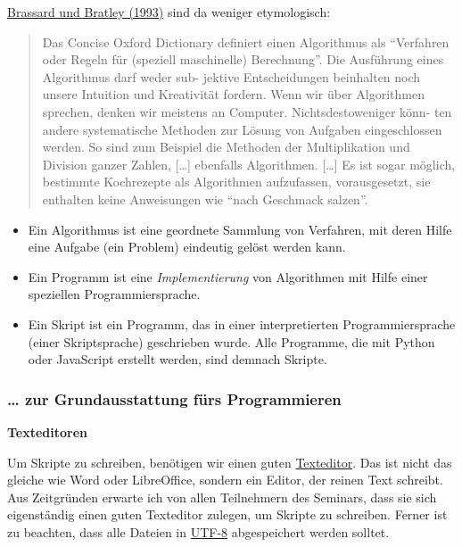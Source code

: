 {\href{http://bibliography.lingpy.org?key=Brassard1993}{Brassard und
Bratley (1993)} sind da weniger etymologisch:}

\begin{quote}
Das Concise Oxford Dictionary definiert einen Algorithmus als
``Verfahren oder Regeln für (speziell maschinelle) Berechnung''. Die
Ausführung eines Algorithmus darf weder sub- jektive Entscheidungen
beinhalten noch unsere Intuition und Kreativität fordern. Wenn wir über
Algorithmen sprechen, denken wir meistens an Computer.
Nichtsdestoweniger könn- ten andere systematische Methoden zur Lösung
von Aufgaben eingeschlossen werden. So sind zum Beispiel die Methoden
der Multiplikation und Division ganzer Zahlen, {[}\ldots{}{]} ebenfalls
Algorithmen. {[}\ldots{}{]} Es ist sogar möglich, bestimmte Kochrezepte
als Algorithmen aufzufassen, vorausgesetzt, sie enthalten keine
Anweisungen wie ``nach Geschmack salzen''.
\end{quote}



\begin{itemize}
\itemsep1pt\parskip0pt
\item
  Ein Algorithmus ist eine geordnete Sammlung von Verfahren, mit deren
  Hilfe eine Aufgabe (ein Problem) eindeutig gelöst werden kann.
\item
  Ein Programm ist eine \emph{Implementierung} von Algorithmen mit Hilfe
  einer speziellen Programmiersprache.
\item
  Ein Skript ist ein Programm, das in einer interpretierten
  Programmiersprache (einer Skriptsprache) geschrieben wurde. Alle
  Programme, die mit Python oder JavaScript erstellt werden, sind
  demnach Skripte.
\end{itemize}


\subsubsection{\texorpdfstring{{\ldots{} zur Grundausstattung fürs
Programmieren}}{\ldots{} zur Grundausstattung fürs Programmieren}}

\vspace{0.5cm}\par\noindent\textbf{Texteditoren}\vspace{0.5cm}

Um Skripte zu schreiben, benötigen wir einen guten
\href{http://de.wikipedia.org/wiki/Texteditor}{Texteditor}. Das ist
nicht das gleiche wie Word oder LibreOffice, sondern ein Editor, der
reinen Text schreibt. Aus Zeitgründen erwarte ich von allen Teilnehmern
des Seminars, dass sie sich eigenständig einen guten Texteditor zulegen,
um Skripte zu schreiben. Ferner ist zu beachten, dass alle Dateien in
\href{https://de.wikipedia.org/wiki/UTF-8}{UTF-8} abgespeichert werden
solltet.

